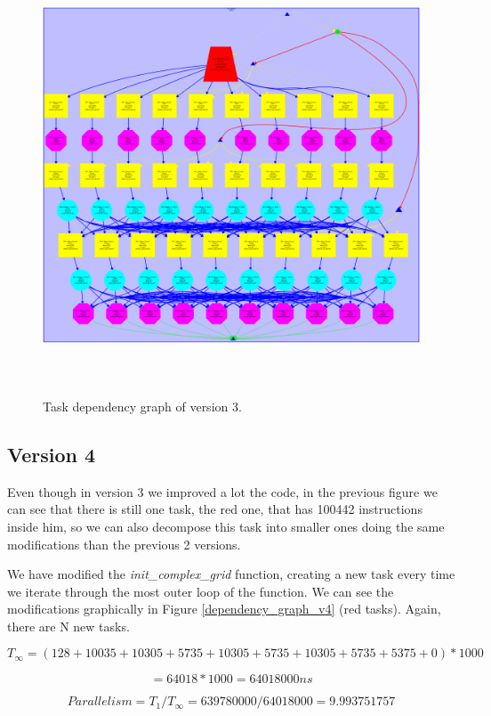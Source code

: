 \documentclass[12pt, a4paper]{article}
\begin{document}
\begin{figure}[H]
  \centering
  \includegraphics[width=15cm,height=13cm]{./images/dependency_graph_v3}
  \caption{Task dependency graph of version 3.}
  \label{dependency_graph_v3}
\end{figure}

\subsection{Version 4}

Even though in version 3 we improved a lot the code, in the previous figure we can see that there is still one task, the red one, that has 100442 instructions inside him, so we can also decompose this task into smaller ones doing the same modifications than the previous 2 versions.

We have modified the \textit{init\_complex\_grid} function, creating a new task every time we iterate through the most outer loop of the function. We can see the modifications graphically in Figure \ref{dependency_graph_v4} (red tasks). Again, there are N new tasks.

\[ T_\infty = (128 + 10035 + 10305 + 5735 + 10305 + 5735 + 10305 + 5735 + 5375 + 0) * 1000 \]

\[  = 64018 * 1000 = 64018000 ns \]

\[ Parallelism = T_1/T_\infty = 639780000/64018000 = 9.993751757 \]
\end{document}
